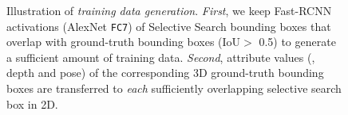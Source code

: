 \documentclass[10pt,twocolumn,letterpaper]{article}
\begin{document}
\begin{figure}
\caption{Illustration of \emph{training data generation}. \emph{First}, we keep Fast-RCNN \cite{Girshick15a} activations 
(AlexNet \texttt{FC7}) of Selective Search \cite{Uijlings13a} bounding boxes that overlap with ground-truth
bounding boxes (IoU$>$ 0.5) to generate a sufficient amount of 
training data. \emph{Second}, attribute values (\ie, depth and pose) of the corresponding 3D ground-truth
bounding boxes are transferred to \emph{each} sufficiently overlapping 
selective search box in 2D.\label{fig:trainingdata}}
\end{figure}
\end{document}
